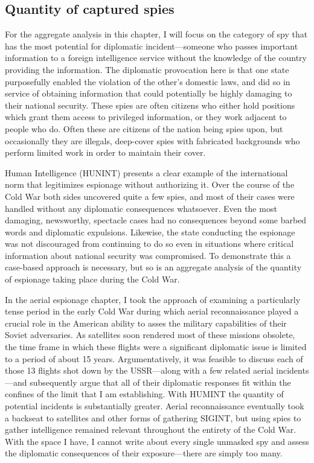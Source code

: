 \documentclass{memoir}
\begin{document}
\begin{refsegment}
\subsection{Quantity of captured spies}
For the aggregate analysis in this chapter, I will focus on the category of spy that has the most potential for diplomatic incident---someone who passes important information to a foreign intelligence service without the knowledge of the country providing the information. The diplomatic provocation here is that one state purposefully enabled the violation of the other's domestic laws, and did so in service of obtaining information that could potentially be highly damaging to their national security. These spies are often citizens who either hold positions which grant them access to privileged information, or they work adjacent to people who do. Often these are citizens of the nation being spies upon, but occasionally they are illegals, deep-cover spies with fabricated backgrounds who perform limited work in order to maintain their cover.

Human Intelligence (HUNINT) presents a clear example of the international norm that legitimizes espionage without authorizing it. Over the course of the Cold War both sides uncovered quite a few spies, and most of their cases were handled without any diplomatic consequences whatsoever. Even the most damaging, newsworthy, spectacle cases had no consequences beyond some barbed words and diplomatic expulsions. Likewise, the state conducting the espionage was not discouraged from continuing to do so even in situations where critical information about national security was compromised. To demonstrate this a case-based approach is necessary, but so is an aggregate analysis of the quantity of espionage taking place during the Cold War.

In the aerial espionage chapter, I took the approach of examining a particularly tense period in the early Cold War during which aerial reconnaissance played a crucial role in the American ability to asses the military capabilities of their Soviet adversaries. As satellites soon rendered most of these missions obsolete, the time frame in which these flights were a significant diplomatic issue is limited to a period of about 15 years. Argumentatively, it was feasible to discuss each of those 13 flights shot down by the USSR---along with a few related aerial incidents---and subsequently argue that all of their diplomatic responses fit within the confines of the limit that I am establishing. With HUMINT the quantity of potential incidents is substantially greater. Aerial reconnaissance eventually took a backseat to satellites and other forms of gathering SIGINT, but using spies to gather intelligence remained relevant throughout the entirety of the Cold War. With the space I have, I cannot write about every single unmasked spy and assess the diplomatic consequences of their exposure---there are simply too many.


\end{refsegment}
\end{document}
